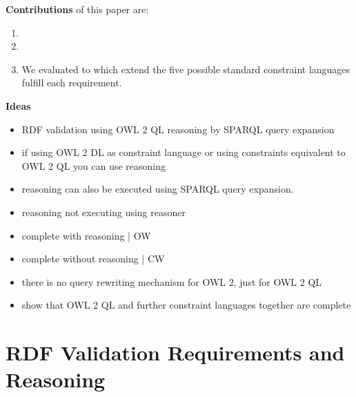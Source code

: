 \documentclass{llncs}
\begin{document}
\textbf{Contributions} of this paper are:
\begin{enumerate}
  \item
	\item
	\item We evaluated to which extend the five possible standard constraint languages fulfill each requirement.
\end{enumerate}

\textbf{Ideas}

\begin{itemize}
	\item RDF validation using OWL 2 QL reasoning by SPARQL query expansion
	\item if using OWL 2 DL as constraint language or using constraints equivalent to OWL 2 QL you can use reasoning 
	\item reasoning can also be executed using SPARQL query expansion.
	\item reasoning not executing using reasoner
\end{itemize}

\begin{itemize}
	\item complete with reasoning | OW
	\item complete without reasoning | CW
	\item there is no query rewriting mechanism for OWL 2, just for OWL 2 QL
	\item show that OWL 2 QL and further constraint languages together are complete
\end{itemize}

\section{RDF Validation Requirements and Reasoning}
\end{document}
